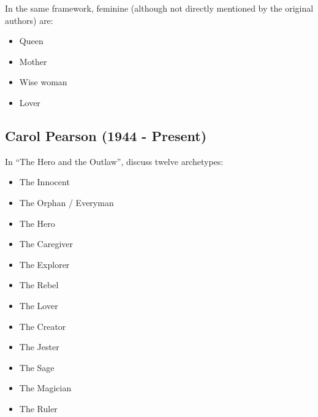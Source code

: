 \documentclass[
]{book}
\providecommand{\tightlist}{%
  \setlength{\itemsep}{0pt}\setlength{\parskip}{0pt}}
\begin{document}
In the same framework, feminine (although not directly mentioned by the original authors) are:

\begin{itemize}
\tightlist
\item
  Queen
\item
  Mother
\item
  Wise woman
\item
  Lover
\end{itemize}

\hypertarget{carol-pearson-1944---present}{%
\subsection{Carol Pearson (1944 - Present)}\label{carol-pearson-1944---present}}

In ``The Hero and the Outlaw'', \citet{mark2001hero} discuss twelve archetypes:

\begin{itemize}
\tightlist
\item
  The Innocent
\item
  The Orphan / Everyman
\item
  The Hero
\item
  The Caregiver
\item
  The Explorer
\item
  The Rebel
\item
  The Lover
\item
  The Creator
\item
  The Jester
\item
  The Sage
\item
  The Magician
\item
  The Ruler
\end{itemize}
\end{document}
